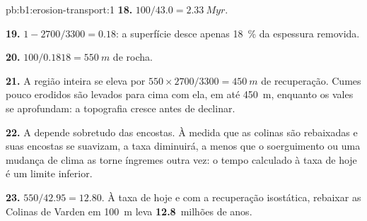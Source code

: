 \begin{solution}{pb:b1:erosion-transport:1}
\textbf{18.} $100/43.0 = \qty{2.33}{Myr}$.

\textbf{19.} $1 - 2700/3300 = 0.18$: a superfície desce apenas
\qty{18}{\percent} da espessura removida.

\textbf{20.} $100/0.1818 = \qty{550}{m}$ de rocha.

\textbf{21.} A região inteira se eleva por $550 \times 2700/3300 = \qty{450}{m}$
de recuperação. Cumes pouco erodidos são levados para cima com ela, em até
\qty{450}{m}, enquanto os vales se aprofundam: a topografia cresce antes de declinar.

\textbf{22.} A  depende sobretudo das encostas. À medida que as colinas são rebaixadas e suas encostas se suavizam, a taxa diminuirá, a menos que o soerguimento ou uma mudança de clima as torne íngremes outra vez: o tempo calculado à taxa de hoje é um limite inferior.

\textbf{23.} $550/42.95 = 12.80$. À taxa de hoje e com a recuperação isostática, rebaixar as Colinas de Varden em \qty{100}{m} leva \textbf{12.8}~milhões de anos.
\end{solution}
